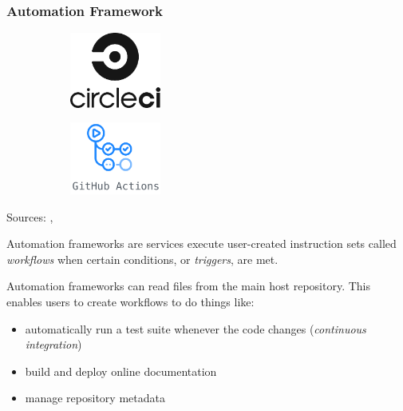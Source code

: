 \begin{frame}[t]
    \frametitle{Automation Framework}
    \begin{figure}[htpb]
        \begin{subfigure}
            \centering
            \includegraphics[width=3cm]{images/circleci-logo.png}
        \end{subfigure}
        \begin{subfigure}
            \centering
            \includegraphics[width=3cm]{images/github-actions-logo.png}
        \end{subfigure}
    \end{figure}
    \begin{center}
        {\tiny Sources: \cite{circle_ci_logo}, \cite{github_actions_logo}}
    \end{center}

    Automation frameworks are services execute user-created instruction sets called {\it workflows} when certain conditions, or {\it triggers}, are met.

    Automation frameworks can read files from the main host repository. This enables users to create workflows to do things like:
    \begin{itemize}
        \item automatically run a test suite whenever the code changes ({\it continuous integration})
        \item build and deploy online documentation
        \item manage repository metadata
    \end{itemize}
    
\end{frame}

